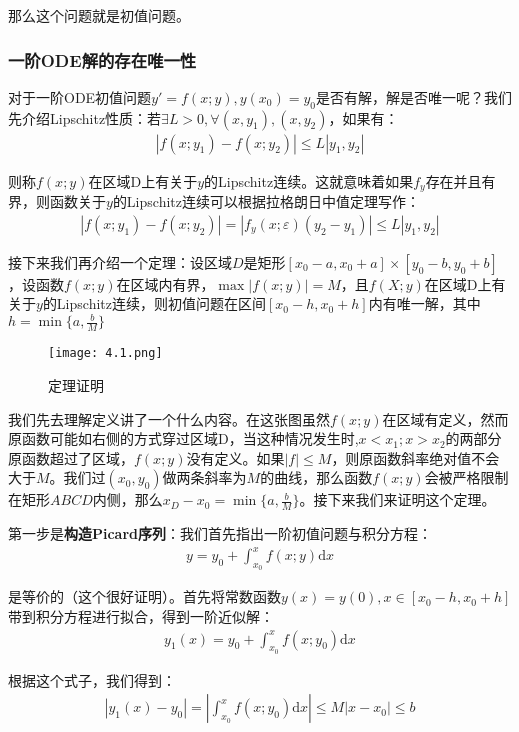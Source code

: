 \documentclass{ctexart}
\let\oldtextbf\textbf
\renewcommand{\textbf}[1]{\textcolor{brown!50!red}{\oldtextbf{#1}}}
\begin{document}
那么这个问题就是初值问题。
\subsubsection{一阶ODE解的存在唯一性}
对于一阶ODE初值问题$y'=f(x;y),y(x_0)=y_0$是否有解，解是否唯一呢？我们先介绍Lipschitz性质：若$\exists L>0,\forall (x,y_1),(x,y_2)$，如果有：
\begin{align*} 
  |f(x;y_1)-f(x;y_2)|\leq L|y_1,y_2|\tag{4-3}
\end{align*}

则称$f(x;y)$在区域D上有关于$y$的Lipschitz连续。这就意味着如果$f_y$存在并且有界，则函数关于$y$的Lipschitz连续可以根据拉格朗日中值定理写作：
\begin{align*} 
  |f(x;y_1)-f(x;y_2)|=|f_y(x;\varepsilon )(y_2-y_1)|\leq L|y_1,y_2|
\end{align*}

接下来我们再介绍一个定理：设区域$D$是矩形$[x_0-a,x_0+a]\times[y_0-b,y_0+b]$，设函数$f(x;y)$在区域内有界，$\max|f(x;y)|=M$，且$f(X;y)$在区域D上有关于$y$的Lipschitz连续，则初值问题在区间$[x_0-h,x_0+h]$内有唯一解，其中$h=\min\{a,\frac{b}{M}\}$
\begin{figure}[h]
\centering
\renewcommand{\figurename}{图}
\renewcommand{\thefigure}{4.1}
\texttt{[image: 4.1.png]}
\caption{\label{fig:4.1.png}定理证明}
\end{figure}

我们先去理解定义讲了一个什么内容。在这张图虽然$f(x;y)$在区域有定义，然而原函数可能如右侧的方式穿过区域D，当这种情况发生时,$x<x_1;x>x_2$的两部分原函数超过了区域，$f(x;y)$没有定义。如果$|f|\leq M$，则原函数斜率绝对值不会大于$M$。我们过$(x_0,y_0)$做两条斜率为$M$的曲线，那么函数$f(x;y)$会被严格限制在矩形$ABCD$内侧，那么$x_D-x_0=\min\{a,\frac{b}{M}\}$。接下来我们来证明这个定理。

第一步是\textbf{\color{brown!50!red}构造Picard序列}：我们首先指出一阶初值问题与积分方程：
\begin{align*} 
  y=y_0+\int_{x_0}^x f(x;y)\mathrm{d}x \tag{4-4}
\end{align*}

是等价的（这个很好证明）。首先将常数函数$y(x)=y(0),x\in[x_0-h,x_0+h]$带到积分方程进行拟合，得到一阶近似解：
\begin{align*} 
  y_1(x)=y_0+\int_{x_0}^x f(x;y_0)\mathrm{d}x \tag{4-5}
\end{align*}

根据这个式子，我们得到：
\begin{align*} 
  |y_1(x)-y_0|=|\int_{x_0}^x f(x;y_0)\mathrm{d}x|\leq M|x-x_0|\leq b 
\end{align*}
\end{document}
